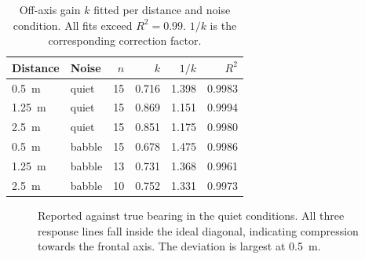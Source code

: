 \begin{table}[htbp]
  \centering
  \caption{Off-axis gain $k$ fitted per distance and noise condition. All fits
  exceed $R^2 = 0.99$. $1/k$ is the corresponding correction factor.}
  \label{tab:gain}
  \begin{tabular}{llrrrr}
    \toprule
    Distance & Noise & $n$ & $k$ & $1/k$ & $R^2$ \\
    \midrule
    \SI{0.5}{\metre}  & quiet  & 15 & 0.716 & 1.398 & 0.9983 \\
    \SI{1.25}{\metre} & quiet  & 15 & 0.869 & 1.151 & 0.9994 \\
    \SI{2.5}{\metre}  & quiet  & 15 & 0.851 & 1.175 & 0.9980 \\
    \addlinespace
    \SI{0.5}{\metre}  & babble & 15 & 0.678 & 1.475 & 0.9986 \\
    \SI{1.25}{\metre} & babble & 13 & 0.731 & 1.368 & 0.9961 \\
    \SI{2.5}{\metre}  & babble & 10 & 0.752 & 1.331 & 0.9973 \\
    \bottomrule
  \end{tabular}
\end{table}

\begin{figure}[htbp]
  \centering
  \caption{Reported against true bearing in the quiet conditions. All three
  response lines fall inside the ideal diagonal, indicating compression
  towards the frontal axis. The deviation is largest at \SI{0.5}{\metre}.}
  \label{fig:compression}
\end{figure}

